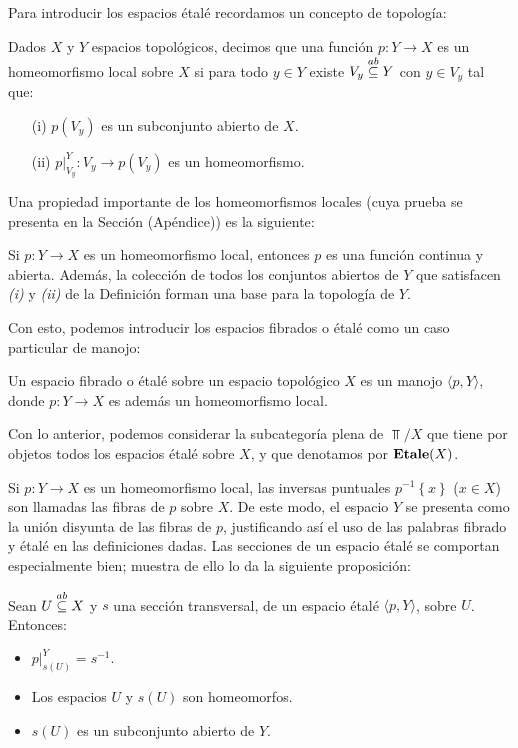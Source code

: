 Para introducir los espacios étalé recordamos un concepto de topología:
\begin{Def}\label{Def:HomeomorfismoLocal}
   Dados $X$ y $Y$ espacios topológicos, decimos que una función $p:Y\to X$ es un homeomorfismo local sobre $X$ si para todo $y\in Y$ existe $V_y\stackrel{ab}{\subseteq} Y$ con $y\in V_y$ tal que:
   \begin{itemize}
      \item[(i)] $p(V_y)$ es un subconjunto abierto de $X$.
      \item[(ii)] $p|^{Y}_{V_y}:V_y\to p(V_y)$ es un homeomorfismo. 
   \end{itemize}
\end{Def}
Una propiedad importante de los homeomorfismos locales (cuya prueba se presenta en la Sección  (Apéndice)) es la siguiente:
\begin{Prop}
   Si $p:Y\to X$ es un homeomorfismo local, entonces $p$ es una función continua y abierta. Además, la colección de todos los conjuntos abiertos de $Y$ que satisfacen \textit{(i)} y \textit{(ii)} de la Definición  forman una base para la topología de $Y$. 
\end{Prop}
Con esto, podemos introducir los espacios fibrados o étalé como un caso particular de manojo:
\begin{Def}
   Un espacio fibrado o étalé sobre un espacio topológico $X$ es un manojo $\langle p, Y\rangle$, donde $p: Y\to X$ es además un homeomorfismo local.
\end{Def}
Con lo anterior, podemos considerar la subcategoría plena de $\Top/X$ que tiene por objetos todos los espacios étalé sobre $X$, y que denotamos por $\normalfont{\textbf{Etale}}(X)$.

Si $p:Y\to X$ es un homeomorfismo local, las inversas puntuales $p^{-1}\left\lbrace x\right\rbrace$ ($x\in X$) son llamadas las fibras de $p$ sobre $X$. De este modo, el espacio $Y$ se presenta como la unión disyunta de las fibras de $p$, justificando así el uso de las palabras fibrado y étalé en las definiciones dadas. Las secciones de un espacio étalé se comportan especialmente bien; muestra de ello lo da la siguiente proposición:
\begin{Prop}
   Sean $U\stackrel{ab}{\subseteq} X$ y $s$ una sección transversal, de un espacio étalé $\langle p, Y\rangle$, sobre $U$. Entonces:
   \begin{itemize}
      \item $p|^{Y}_{s(U)}=s^{-1}$.
      \item Los espacios $U$ y $s(U)$ son homeomorfos.
      \item $s(U)$ es un subconjunto abierto de $Y$.
   \end{itemize}
\end{Prop}
